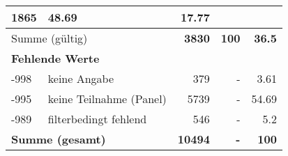 \begin{longtable}{lXrrr}
       \num{1865} &
       \num[round-mode=places,round-precision=2]{48,69} &
         \num[round-mode=places,round-precision=2]{17,77} \\
     \midrule
     \multicolumn{2}{l}{Summe (gültig)} &
       \textbf{\num{3830}} &
     \textbf{100} &
       \textbf{\num[round-mode=places,round-precision=2]{36,5}} \\
     \multicolumn{5}{l}{\textbf{Fehlende Werte}}\\
       -998 &
       keine Angabe &
         \num{379} &
        - &
         \num[round-mode=places,round-precision=2]{3,61} \\
       -995 &
       keine Teilnahme (Panel) &
         \num{5739} &
        - &
         \num[round-mode=places,round-precision=2]{54,69} \\
       -989 &
       filterbedingt fehlend &
         \num{546} &
        - &
         \num[round-mode=places,round-precision=2]{5,2} \\
     \midrule
     \multicolumn{2}{l}{\textbf{Summe (gesamt)}} &
          \textbf{\num{10494}} &
        \textbf{-} &
        \textbf{100} \\
     \bottomrule
     \end{longtable}
     
